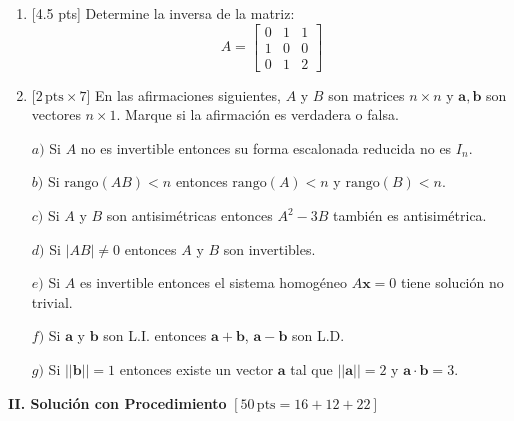 \documentclass[11pt]{article}
\newcommand{\vf}{\fbox{V}\ \fbox{F}}
\begin{document}
\begin{enumerate}
\item{}[4.5 pts] Determine la inversa de la matriz:
\[
A=\begin{bmatrix}0&1&1\\1&0&0\\0&1&2\end{bmatrix}
\]

\vspace{4pt}

\item{}[$2\,\mathrm{pts}\times 7$] En las afirmaciones siguientes, $A$ y $B$ son matrices $n\times n$ y $\mathbf{a},\mathbf{b}$ son vectores $n\times 1$. Marque si la afirmación es verdadera o falsa.

\vspace{6pt}
\noindent $a)$ Si $A$ no es invertible entonces su forma escalonada reducida no es $I_n$. \hfill\vf

\vspace{6pt}
\noindent $b)$ Si $\mathrm{rango}(AB)<n$ entonces $\mathrm{rango}(A)<n$ y $\mathrm{rango}(B)<n$. \hfill\vf

\vspace{6pt}
\noindent $c)$ Si $A$ y $B$ son antisimétricas entonces $A^2-3B$ también es antisimétrica. \hfill\vf

\vspace{6pt}
\noindent $d)$ Si $|AB|\neq 0$ entonces $A$ y $B$ son invertibles. \hfill\vf

\vspace{6pt}
\noindent $e)$ Si $A$ es invertible entonces el sistema homogéneo $A\mathbf{x}=0$ tiene solución no trivial. \hfill\vf

\vspace{6pt}
\noindent $f)$ Si $\mathbf{a}$ y $\mathbf{b}$ son L.I. entonces $\mathbf{a}+\mathbf{b}$, $\mathbf{a}-\mathbf{b}$ son L.D. \hfill\vf

\vspace{6pt}
\noindent $g)$ Si $||\mathbf{b}||=1$ entonces existe un vector $\mathbf{a}$ tal que $||\mathbf{a}||=2$ y $\mathbf{a}\cdot\mathbf{b}=3$. \hfill\vf
\end{enumerate}

\newpage
\begin{center}\textbf{II. Solución con Procedimiento} $[50\,\mathrm{pts} = 16+12+22]$\end{center}
\end{document}
